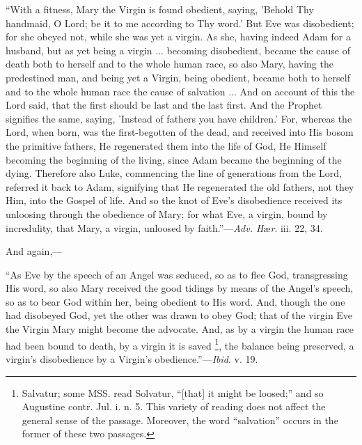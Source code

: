 ``With a fitness, Mary the Virgin is found obedient, saying,
'Behold Thy handmaid, O Lord; be it to me according to Thy word.' But
Eve was disobedient; for she obeyed not, while she was yet a virgin. As
she, having indeed Adam for a husband, but as yet being a virgin ...
becoming disobedient, became the cause of death both to herself and to
the whole human race, so also Mary, having the predestined man, and
being yet a Virgin, being obedient, became both to herself and to the
whole human race the cause of salvation ... And on account of this the
Lord said, that the first should be last and the last first. And the
Prophet signifies the same, saying, 'Instead of fathers you have
children.' For, whereas the Lord, when born, was the first-begotten of
the dead, and received into His bosom the primitive fathers, He
regenerated them into the life of God, He Himself becoming the beginning
of the living, since Adam became the beginning of the dying. Therefore
also Luke, commencing the line of generations from the Lord,
referred it back to Adam, signifying that He regenerated the old
fathers, not they Him, into the Gospel of life. And so the knot of Eve's
disobedience received its unloosing through the obedience of Mary; for
what Eve, a virgin, bound by incredulity, that Mary, a virgin, unloosed
by faith.''—\emph{Adv. H}æ\emph{r}. iii. 22, 34.

And again,—

``As Eve by the speech of an Angel was seduced, so as to flee God,
transgressing His word, so also Mary received the good tidings by means
of the Angel's speech, so as to bear God within her, being obedient to
His word. And, though the one had disobeyed God, yet the other was drawn
to obey God; that of the virgin Eve the Virgin Mary might become the
advocate. And, as by a virgin the human race had been bound to death, by
a virgin it is saved \footnote{Salvatur; some
MSS. read Solvatur, ``[that] it might be loosed;'' and so
Augustine contr. Jul. i. n. 5. This variety of reading does not affect
the general sense of the passage. Moreover, the word
``salvation'' occurs in the former of these two passages.}, the
balance being preserved, a virgin's disobedience by a Virgin's
obedience.''—\emph{Ibid}. v. 19.

